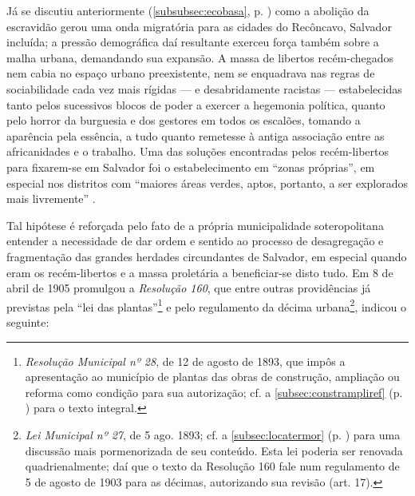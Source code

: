 Já se discutiu anteriormente (\autoref{subsubsec:ecobasa}, p. \pageref{subsubsec:ecobasa}) como a abolição da escravidão gerou uma onda migratória para as cidades do Recôncavo, Salvador incluída; a pressão demográfica daí resultante exerceu força também sobre a malha urbana, demandando sua expansão. A massa de libertos recém-chegados nem cabia no espaço urbano preexistente, nem se enquadrava nas regras de sociabilidade cada vez mais rígidas --- e desabridamente racistas --- estabelecidas tanto pelos sucessivos blocos de poder a exercer a hegemonia política, quanto pelo horror da burguesia e dos gestores em todos os escalões, tomando a aparência pela essência, a tudo quanto remetesse à antiga associação entre as africanidades e o trabalho. Uma das soluções encontradas pelos recém-libertos para fixarem-se em Salvador foi o estabelecimento em ``zonas próprias'', em especial nos distritos com ``maiores áreas verdes, aptos, portanto, a ser explorados mais livremente'' \cite{santos_habitacao_1990}. 

Tal hipótese é reforçada pelo fato de a própria municipalidade soteropolitana entender a necessidade de dar ordem e sentido ao processo de desagregação e fragmentação das grandes herdades circundantes de Salvador, em especial quando eram os recém-libertos e a massa proletária a beneficiar-se disto tudo. Em 8 de abril de 1905 promulgou a \textit{Resolução 160}, que entre outras providências já previstas pela ``lei das plantas''\footnote{\textit{Resolução Municipal nº 28}, de 12 de agosto de 1893, que impôs a apresentação ao município de plantas das obras de construção, ampliação ou reforma como condição para sua autorização; cf. a \autoref{subsec:constrampliref} (p. \pageref{subsec:constrampliref}) para o texto integral.} e pelo regulamento da décima urbana\footnote{\textit{Lei Municipal nº 27}, de 5 ago. 1893; cf. a \autoref{subsec:locatermor} (p. \pageref{subsec:locatermor}) para uma discussão mais pormenorizada de seu conteúdo. Esta lei poderia ser renovada quadrienalmente; daí que o texto da Resolução 160 fale num regulamento de 5 de agosto de 1903 para as décimas, autorizando sua revisão (art. 17).}, indicou o seguinte:

